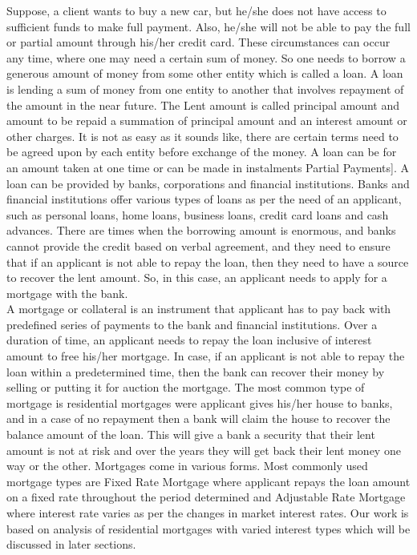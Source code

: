 Suppose, a client wants to buy a new car, but he/she does not have access to sufficient funds to make full payment. Also, he/she will not be able to pay the full or partial amount through his/her credit card. These circumstances can occur any time, where one may need a certain sum of money. So one needs to borrow a generous amount of money from some other entity which is called a loan. A loan is lending a sum of money from one entity to another that involves repayment of the amount in the near future. The Lent amount is called principal amount and amount to be repaid a summation of principal amount and an interest amount or other charges. It is not as easy as it sounds like, there are certain terms need to be agreed upon by each entity before exchange of the money. A loan can be for an amount taken at one time or can be made in instalments {Partial Payments]. A loan can be provided by banks, corporations and financial institutions. Banks and financial institutions offer various types of loans as per the need of an applicant, such as personal loans, home loans, business loans, credit card loans and cash advances. There are times when the borrowing amount is enormous, and banks cannot provide the credit based on verbal agreement, and they need to ensure that if an applicant is not able to repay the loan, then they need to have a source to recover the lent amount. So, in this case, an applicant needs to apply for a mortgage with the bank.\\

A mortgage or collateral is an instrument that applicant has to pay back with predefined series of payments to the bank and financial institutions. Over a duration of time, an applicant needs to repay the loan inclusive of interest amount to free his/her mortgage. In case, if an applicant is not able to repay the loan within a predetermined time, then the bank can recover their money by selling or putting it for auction the mortgage. The most common type of mortgage is residential mortgages were applicant gives his/her house to banks, and in a case of no repayment then a bank will claim the house to recover the balance amount of the loan. This will give a bank a security that their lent amount is not at risk and over the years they will get back their lent money one way or the other. Mortgages come in various forms. Most commonly used mortgage types are Fixed Rate Mortgage where applicant repays the loan amount on a fixed rate throughout the period determined and Adjustable Rate Mortgage where interest rate varies as per the changes in market interest rates. Our work is based on analysis of residential mortgages with varied interest types which will be discussed in later sections.\\

}
